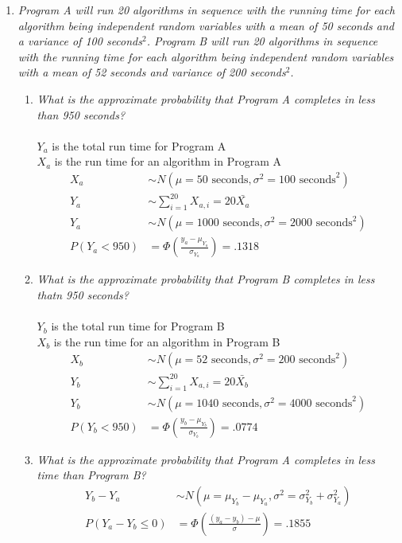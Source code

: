 \documentclass{article} %
\begin{document}
\thispagestyle{fancy} %

\begin{enumerate}
	
	\item \textit{Program A will run 20 algorithms in sequence with the running time for each algorithm being independent random variables with a mean of 50 seconds and a variance of 100 seconds$^2$. Program B will run 20 algorithms in sequence with the running time for each algorithm being independent random variables with a mean of 52 seconds and variance of 200 seconds$^2$.}
	\begin{enumerate}
	\item \textit{What is the approximate probability that Program A completes in less than 950 seconds?}\\
	\\
	$Y_a$ is the total run time for Program A\\
	$X_a$ is the run time for an algorithm in Program A\\
	\begin{align*}
	X_a &\sim N(\mu = 50 \text{ seconds}, \sigma^2 = 100 \text{ seconds}^2)\\
	Y_a &\sim \sum_{i = 1}^{20} X_{a,i} = 20 \bar{X_a}\\
	Y_a &\sim N(\mu = 1000 \text{ seconds}, \sigma^2 = 2000 \text{ seconds}^2)\\
	P(Y_a < 950) &= \Phi(\frac{y_a - \mu_{Y_a}}{\sigma_{Y_a}}) = .1318
	\end{align*}
	
	\item \textit{What is the approximate probability that Program B completes in less thatn 950 seconds?}\\
	\\
	$Y_b$ is the total run time for Program B\\
	$X_b$ is the run time for an algorithm in Program B\\
	\begin{align*}
	X_b &\sim N(\mu = 52 \text{ seconds}, \sigma^2 = 200 \text{ seconds}^2)\\
	Y_b &\sim \sum_{i = 1}^{20} X_{a,i} = 20 \bar{X_b}\\
	Y_b &\sim N(\mu = 1040 \text{ seconds}, \sigma^2 = 4000 \text{ seconds}^2)\\
	P(Y_b < 950) &= \Phi(\frac{y_b - \mu_{Y_b}}{\sigma_{Y_b}}) = .0774
	\end{align*}
	
	\item \textit{What is the approximate probability that Program A completes in less time than Program B?}
	\begin{align*}
	Y_b - Y_a &\sim N(\mu = \mu_{Y_b} - \mu_{Y_a}, \sigma^2 = \sigma_{Y_b}^2 + \sigma_{Y_a}^2)\\
	P(Y_a - Y_b \leq 0) &= \Phi(\frac{(y_a - y_b) - \mu}{\sigma}) = .1855
	\end{align*}
	

\end{enumerate}
\end{enumerate}
\end{document}
